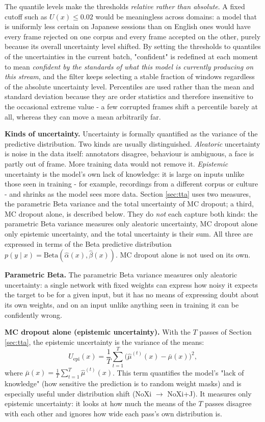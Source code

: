 \documentclass[10pt,a4paper,twocolumn]{article}
\begin{document}
	The quantile levels make the thresholds \emph{relative rather than absolute}. A fixed cutoff such as $U(x) \le 0.02$ would be meaningless across domains: a model that is uniformly less certain on Japanese sessions than on English ones would have every frame rejected on one corpus and every frame accepted on the other, purely because its overall uncertainty level shifted. By setting the thresholds to quantiles of the uncertainties in the current batch, "confident" is redefined at each moment to mean \emph{confident by the standards of what this model is currently producing on this stream}, and the filter keeps selecting a stable fraction of windows regardless of the absolute uncertainty level. Percentiles are used rather than the mean and standard deviation because they are order statistics and therefore insensitive to the occasional extreme value - a few corrupted frames shift a percentile barely at all, whereas they can move a mean arbitrarily far.

	\textbf{Kinds of uncertainty.} Uncertainty is formally quantified as the variance of the predictive distribution. Two kinds are usually distinguished. \emph{Aleatoric} uncertainty is noise in the data itself: annotators disagree, behaviour is ambiguous, a face is partly out of frame. More training data would not remove it. \emph{Epistemic} uncertainty is the model's own lack of knowledge: it is large on inputs unlike those seen in training - for example, recordings from a different corpus or culture - and shrinks as the model sees more data. Section \ref{sec:tta} uses two measures, the parametric Beta variance and the total uncertainty of MC dropout; a third, MC dropout alone, is described below. They do \emph{not} each capture both kinds: the parametric Beta variance measures only aleatoric uncertainty, MC dropout alone only epistemic uncertainty, and the total uncertainty is their sum. All three are expressed in terms of the Beta predictive distribution $p(y \mid x) = \mathrm{Beta}(\hat{\alpha}(x),\hat{\beta}(x))$. MC dropout alone is not used on its own.

	\textbf{Parametric Beta.} The parametric Beta variance measures only aleatoric uncertainty: a single network with fixed weights can express how noisy it expects the target to be for a given input, but it has no means of expressing doubt about its own weights, and on an input unlike anything seen in training it can be confidently wrong.

	\textbf{MC dropout alone (epistemic uncertainty).} With the $T$ passes of Section \ref{sec:tta}, the epistemic uncertainty is the variance of the means:
		$$
		U_{\text{epi}}(x) = \frac{1}{T}\sum_{t=1}^T \bigl(\hat{\mu}^{(t)}(x) - \bar{\mu}(x)\bigr)^2,
		$$
	where $\bar{\mu}(x) = \frac{1}{T}\sum_{t=1}^T \hat{\mu}^{(t)}(x)$. This term quantifies the model's "lack of knowledge" (how sensitive the prediction is to random weight masks) and is especially useful under distribution shift (NoXi $\to$ NoXi+J). It measures only epistemic uncertainty: it looks at how much the means of the $T$ passes disagree with each other and ignores how wide each pass's own distribution is.
\end{document}
